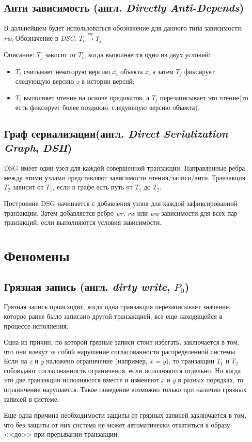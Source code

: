 \documentclass[14pt,  openany]{book}
\begin{document}
\subsection{Анти зависимость (англ. \textit{Directly Anti-Depends})}
В дальнейшем будет использоваться обозначение для данного типа зависимости: \textit{rw}. Обозначение в \textit{DSG}: $T_i  \xrightarrow{\textit{rw}} T_j$
\par
Описание: $T_j$ зависит от $T_i$,  когда выполняется одно из двух условий:
\begin{itemize}
\item $T_i$ считывает некоторую версию $x_i$ объекта \textit{x}, а затем $T_j$  фиксирует следующую версию \textit{x} в истории версий;
\item $T_i$ выполняет чтение на основе предикатов, а $T_j$ перезаписывает это чтение(то есть фиксирует более позднюю, следующую версию  объекта).
\end{itemize}

\subsection{Граф сериализации(англ. \textit{Direct Serialization Graph}, \textit{DSH})}
DSG имеет один узел для каждой совершенной транзакции. Направленные ребра между этими узлами представляют зависимости чтения/записи/анти. Транзакция $T_2$ зависит от $T_1$, если в графе есть путь от $T_1$ до $T_2$. 
\par
Построение DSG начинается с добавления узлов для каждой зафиксированной транзакции. Затем добавляется ребро \textit{wr}, \textit{rw} или \textit{ww} зависимости для всех пар транзакций, если выполняются условия зависимости.

\section{Феномены}
\subsection{Грязная запись (англ.  \textit{dirty write}, $P_0$) \cite{CritiqueANSI_SQL}}
Грязная запись происходит, когда одна транзакция перезаписывает значение, которое ранее было записано другой транзакцией, все еще находящейся в процессе исполнения.
\par Одна из причин, по которой грязные записи стоит избегать, заключается в том, что они влекут за собой нарушение согласованности распределенной системы.  Если на \textit{x} и \textit{y} наложено ограничение (например, $x = y$), то транзакции $T_1$ и $T_2$ соблюдают согласованность ограничения, если исполняются отдельно.  Но когда эти две транзакции исполняются вместе и изменяют \textit{x} и \textit{y} в разных порядках, то ограничение нарушается.  Такое поведение возможно только при наличии грязных записей в системе.
\par Еще одна причина необходимости защиты от грязных записей заключается в том, что без защиты от них система не может автоматически откатиться к образу <<до>> при прерывании транзакции.
\end{document}
